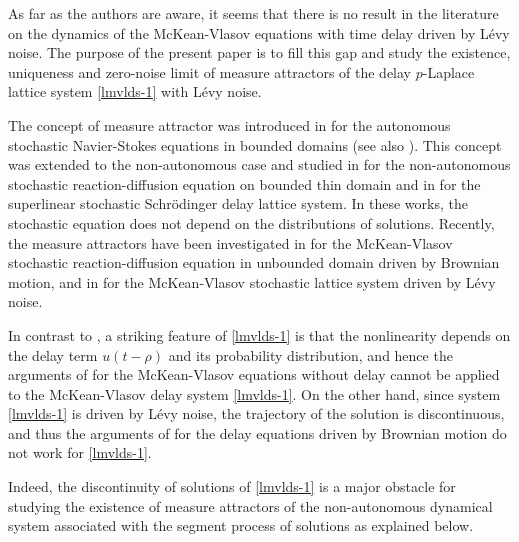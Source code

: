 \documentclass[11pt]{article}
\numberwithin{equation}{section}
\theoremstyle{plain}
\begin{document}
   As far as the authors are aware,
   it seems that there is no result in the literature
   on the dynamics
   of the  McKean-Vlasov    equations
   with time delay
    driven by 
    L\'{e}vy noise.
    The purpose of the present  paper
    is to fill
     this gap and study the
    existence, uniqueness and zero-noise
    limit of measure attractors
    of the delay
    $p$-Laplace lattice system
    \eqref{lmvlds-1} with  L\'{e}vy noise.
    
    
    
      The 
      concept of measure attractor 
      was introduced 
      in \cite{S1991MN}
      for the 
        autonomous stochastic Navier-Stokes 
        equations in bounded domains
         (see also   \cite{CC1998EJP}).  
        This concept was extended to
        the non-autonomous case and studied
        in
        \cite{LW2024JDE} for
        the  non-autonomous stochastic reaction-diffusion equation on bounded thin domain  and  in 
   \cite{CWZ2025JNS}     
   for the  superlinear stochastic Schr\"{o}dinger 
   delay lattice system. 
 In these works, 
 the  stochastic equation
 does not  depend on the distributions of solutions.    
 Recently, 
 the  measure attractors
 have been 
 investigated 
 in  \cite{SSW2026JDE}
  for the  McKean-Vlasov 
  stochastic   reaction-diffusion equation
  in unbounded domain driven by Brownian motion,
  and in 
  \cite{BCS2026JDE}  for
  the  McKean-Vlasov stochastic lattice system
  driven by L\'{e}vy noise.
  
   	      
 In contrast to \cite{SSW2026JDE, BCS2026JDE},  
 a striking feature of \eqref{lmvlds-1} is that 
 the
 nonlinearity  depends on the delay term $u(t-\rho)$ and its probability distribution,
 and  hence the arguments of
  \cite{SSW2026JDE, BCS2026JDE}
  for the McKean-Vlasov  equations without delay
  cannot be applied to   
  the McKean-Vlasov  delay system \eqref{lmvlds-1}.
  On the other hand,
  since system \eqref{lmvlds-1}
  is driven by 
  L\'{e}vy noise,
  the trajectory of the solution
  is discontinuous, and thus
  the arguments of 
  \cite{SSL2024arXiv, CWZ2025JNS}
 for  the   delay 
 equations driven by
 Brownian motion 
 do not work for   \eqref{lmvlds-1}.
 
 
 Indeed, the 
   discontinuity of solutions 
   of \eqref{lmvlds-1}
   is a major obstacle for studying
   the existence of
   measure attractors
   of the non-autonomous
   dynamical system
   associated with the
   segment process of 
   solutions as explained below.
   
\end{document}
